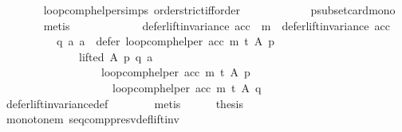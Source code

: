\begin{isabellebody}
\ \ \ \ \ \ \isamarkupfalse%
\ loop{\isacharunderscore}{\kern0pt}comp{\isacharunderscore}{\kern0pt}helper{\isachardot}{\kern0pt}simps{\isacharparenleft}{\kern0pt}{}{\isacharparenright}{\kern0pt}\ order{\isachardot}{\kern0pt}strict{\isacharunderscore}{\kern0pt}iff{\isacharunderscore}{\kern0pt}order\isanewline
\ \ \ \ \ \ \ \ \ \ \ \ psubset{\isacharunderscore}{\kern0pt}card{\isacharunderscore}{\kern0pt}mono\isanewline
\ \ \ \ \ \ \isamarkupfalse%
\ metis\isanewline
\ \ \ \ \isamarkupfalse%
\ \isamarkupfalse%
\isanewline
\ \ \ \ \ \ {\isachardoublequoteopen}{\isacharparenleft}{\kern0pt}defer{\isacharunderscore}{\kern0pt}lift{\isacharunderscore}{\kern0pt}invariance\ {\isacharparenleft}{\kern0pt}acc\ {\isasymtriangleright}\ m{\isacharparenright}{\kern0pt}\ {\isasymand}\ defer{\isacharunderscore}{\kern0pt}lift{\isacharunderscore}{\kern0pt}invariance\ acc{\isacharparenright}{\kern0pt}\ {\isasymlongrightarrow}\isanewline
\ \ \ \ \ \ \ \ \ \ {\isacharparenleft}{\kern0pt}{\isasymforall}q\ a{\isachardot}{\kern0pt}\ {\isacharparenleft}{\kern0pt}a\ {\isasymin}\ {\isacharparenleft}{\kern0pt}defer\ {\isacharparenleft}{\kern0pt}loop{\isacharunderscore}{\kern0pt}comp{\isacharunderscore}{\kern0pt}helper\ acc\ m\ t{\isacharparenright}{\kern0pt}\ A\ p{\isacharparenright}{\kern0pt}\ {\isasymand}\isanewline
\ \ \ \ \ \ \ \ \ \ \ \ \ \ lifted\ A\ p\ q\ a{\isacharparenright}{\kern0pt}\ {\isasymlongrightarrow}\isanewline
\ \ \ \ \ \ \ \ \ \ \ \ \ \ \ \ \ \ {\isacharparenleft}{\kern0pt}loop{\isacharunderscore}{\kern0pt}comp{\isacharunderscore}{\kern0pt}helper\ acc\ m\ t{\isacharparenright}{\kern0pt}\ A\ p\ {\isacharequal}{\kern0pt}\isanewline
\ \ \ \ \ \ \ \ \ \ \ \ \ \ \ \ \ \ \ \ {\isacharparenleft}{\kern0pt}loop{\isacharunderscore}{\kern0pt}comp{\isacharunderscore}{\kern0pt}helper\ acc\ m\ t{\isacharparenright}{\kern0pt}\ A\ q{\isacharparenright}{\kern0pt}{\isachardoublequoteclose}\isanewline
\ \ \ \ \ \ \isamarkupfalse%
\ defer{\isacharunderscore}{\kern0pt}lift{\isacharunderscore}{\kern0pt}invariance{\isacharunderscore}{\kern0pt}def\isanewline
\ \ \ \ \ \ \isamarkupfalse%
\ metis\isanewline
\ \ \ \ \isamarkupfalse%
\ {\isacharquery}{\kern0pt}thesis\isanewline
\ \ \ \ \ \ \isamarkupfalse%
\ monotone{\isacharunderscore}{\kern0pt}m\ seq{\isacharunderscore}{\kern0pt}comp{\isacharunderscore}{\kern0pt}presv{\isacharunderscore}{\kern0pt}def{\isacharunderscore}{\kern0pt}lift{\isacharunderscore}{\kern0pt}inv\isanewline
\ \ \ \ \ \ \isamarkupfalse%

\end{isabellebody}
